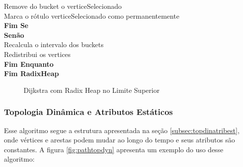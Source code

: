 {\begin{minipage}{70ex}
\vspace*{-1mm} \phantom{} \hspace{9ex} Remove do bucket o verticeSelecionado\\
\vspace*{-1mm} \phantom{} \hspace{9ex} Marca o rótulo verticeSelecionado como permanentemente\\
\vspace*{-1mm} \phantom{} \hspace{6ex} {\bf Fim Se}\\
\vspace*{-1mm} \phantom{} \hspace{6ex} {\bf Senão}\\
\vspace*{-1mm} \phantom{} \hspace{9ex} Recalcula o intervalo dos buckets\\
\vspace*{-1mm} \phantom{} \hspace{9ex} Redistribui os vertices\\
\vspace*{-1mm} \phantom{} \hspace{3ex} {\bf Fim Enquanto}\\
\vspace*{-1mm} \phantom{} \hspace{0ex} {\bf Fim RadixHeap}\\
\end{minipage}}
\begin{figure}[htbp]
\centering
\caption{Dijkstra com Radix Heap no Limite Superior}
\label{fig:radixMod}
\end{figure}




\subsubsection{Topologia Dinâmica e Atributos Estáticos}
Esse algoritmo segue a estrutura apresentada na seção \ref{subsec:topdinatribest}, onde vértices e arestas
podem mudar ao longo do tempo e seus atributos são constantes. A figura \ref{fig:pathtopdyn} apresenta um 
exemplo do uso desse algoritmo:

